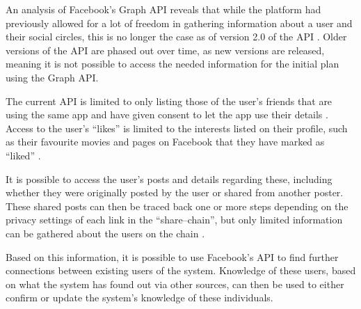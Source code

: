 An analysis of Facebook's Graph \ac{API} \citep{FacebookGraphApiDocumentation}
reveals that while the platform had previously allowed for a lot of freedom in
gathering information about a user and their social circles, this is no longer
the case as of version 2.0 of the API \citep{FacebookChangesInGraphTwoPointOh}.
Older versions of the \ac{API} are phased out over time, as new versions are
released, meaning it is not possible to access the needed information for the
initial plan using the Graph API.\nl

The current \ac{API} is limited to only listing those of the user's friends
that are using the same app and have given consent to let the app use their
details \citep{FacebookChangesInGraphTwoPointOh}. Access to the user's ``likes''
is limited to the interests listed on their profile, such as their favourite
movies and pages on Facebook that they have marked as ``liked''
\citep{FacebookGraphApiUserLikes} \citep{FacebookGraphApiUserEdges}.\nl

It is possible to access the user's posts and details regarding these,
including whether they were originally posted by the user or shared from
another poster. These shared posts can then be traced back one or more steps
depending on the privacy settings of each link in the ``share--chain'', but
only limited information can be gathered about the users on the chain
\citep{FacebookGraphApiUserFeed}.\nl

Based on this information, it is possible to use Facebook's \ac{API} to find
further connections between existing users of the system.
Knowledge of these users, based on what the system has found out via other
sources, can then be used to either confirm or update the system's knowledge of
these individuals.